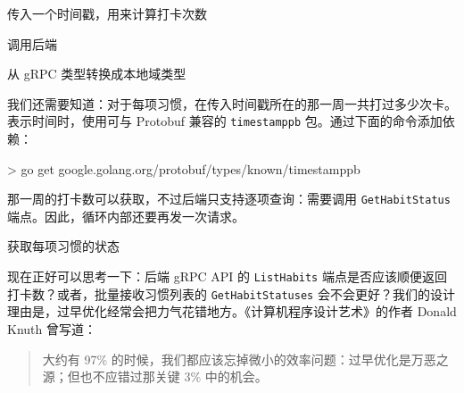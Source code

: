 \begin{codeannotations}
\item 传入一个时间戳，用来计算打卡次数
\item 调用后端
\item 从 gRPC 类型转换成本地域类型
\end{codeannotations}

我们还需要知道：对于每项习惯，在传入时间戳所在的那一周一共打过多少次卡。表示时间时，使用可与 Protobuf 兼容的 \texttt{timestamppb} 包。通过下面的命令添加依赖：

\begin{shellcode}[]
> go get google.golang.org/protobuf/types/known/timestamppb
\end{shellcode}

那一周的打卡数可以获取，不过后端只支持逐项查询：需要调用 \texttt{GetHabitStatus} 端点。因此，循环内部还要再发一次请求。


\begin{codeannotations}
\item 获取每项习惯的状态
\end{codeannotations}

现在正好可以思考一下：后端 gRPC API 的 \texttt{ListHabits} 端点是否应该顺便返回打卡数？或者，批量接收习惯列表的 \texttt{GetHabitStatuses} 会不会更好？我们的设计理由是，过早优化经常会把力气花错地方。《计算机程序设计艺术》的作者 Donald Knuth 曾写道：

\begin{quote}
大约有 97\% 的时候，我们都应该忘掉微小的效率问题：过早优化是万恶之源；但也不应错过那关键 3\% 中的机会。
\end{quote}

